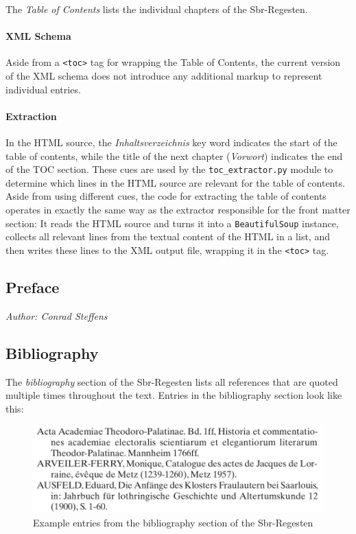 The \emph{Table of Contents} lists the individual chapters of the
Sbr-Regesten.

\paragraph{XML Schema}

Aside from a \texttt{<toc>} tag for wrapping the Table of Contents,
the current version of the XML schema does not introduce any
additional markup to represent individual entries.

\paragraph{Extraction}

In the HTML source, the \emph{Inhaltsverzeichnis} key word indicates
the start of the table of contents, while the title of the next
chapter (\emph{Vorwort}) indicates the end of the TOC section. These
cues are used by the \texttt{toc\_extractor.py} module to determine
which lines in the HTML source are relevant for the table of contents.
Aside from using different cues, the code for extracting the table of
contents operates in exactly the same way as the extractor responsible
for the front matter section: It reads the HTML source and turns it
into a \texttt{BeautifulSoup} instance, collects all relevant lines
from the textual content of the HTML in a list, and then writes these
lines to the XML output file, wrapping it in the \texttt{<toc>} tag.

\subsection{Preface}
\label{sec:preface}

\emph{Author: Conrad Steffens} \\

\subsection{Bibliography}
\label{sec:bibl}

The \emph{bibliography} section of the Sbr-Regesten lists all
references that are quoted multiple times throughout the text. Entries
in the bibliography section look like this:

\begin{figure}[h]
  \centering
  \includegraphics[width=1.0\textwidth]{img/bibl-entries}
  \caption{Example entries from the bibliography section of the Sbr-Regesten}
  \label{fig:bibl-entries}
\end{figure}

